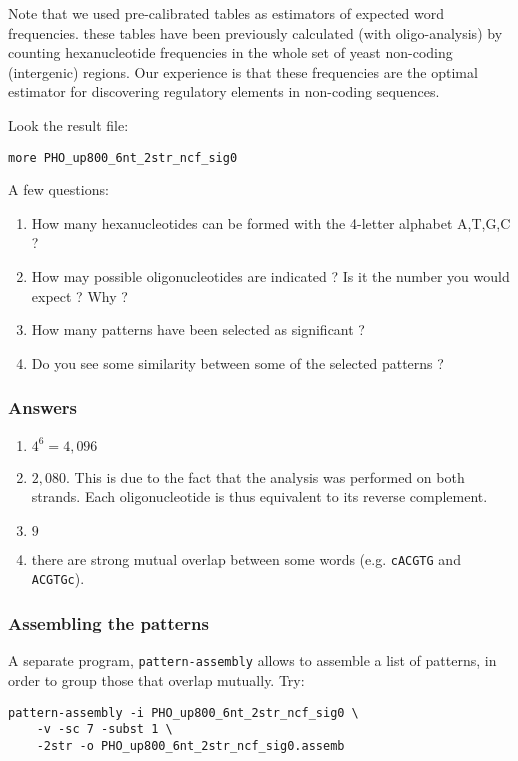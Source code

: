 Note that we used pre-calibrated tables as estimators of expected word
frequencies. these tables have been previously calculated (with
oligo-analysis) by counting hexanucleotide frequencies in the whole
set of yeast non-coding (intergenic) regions. Our experience is that
these frequencies are the optimal estimator for discovering regulatory
elements in non-coding sequences. 

Look the result file:

\begin{verbatim}
more PHO_up800_6nt_2str_ncf_sig0
\end{verbatim}

A few questions:
\begin{enumerate}
\item How many hexanucleotides can be formed with the 4-letter alphabet A,T,G,C ?
\item How may possible oligonucleotides are indicated ? Is it the number you would expect ? Why ?
\item How many patterns have been selected as significant ?
\item Do you see some similarity between some of the selected patterns ?
\end{enumerate}

\subsubsection{Answers}

\begin{enumerate}
\item $4^6=4,096$
\item $2,080$. This is due to the fact that the analysis was performed on
both strands. Each oligonucleotide is thus equivalent to its reverse
complement.
\item $9$
\item there are strong mutual overlap between some words (e.g. \texttt{cACGTG}
and \texttt{ACGTGc}).
\end{enumerate}

\subsubsection{Assembling the patterns}

A separate program, \texttt{pattern-assembly} allows to assemble a
list of patterns, in order to group those that overlap mutually. Try:

\begin{verbatim}
pattern-assembly -i PHO_up800_6nt_2str_ncf_sig0 \
    -v -sc 7 -subst 1 \
    -2str -o PHO_up800_6nt_2str_ncf_sig0.assemb
\end{verbatim}



